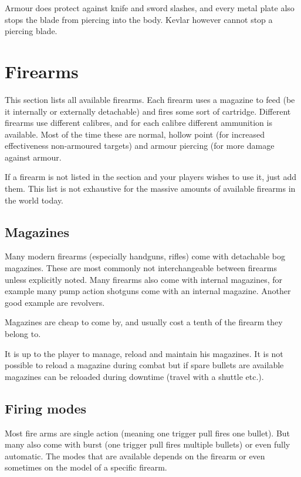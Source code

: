 Armour does protect against knife and sword slashes, and every metal plate
also stops the blade from piercing into the body. Kevlar however cannot stop
a piercing blade.

\section{Firearms}
\label{sec:9-Firearms}

This section lists all available firearms. Each firearm uses a magazine to feed
(be it internally or externally detachable) and fires some sort of cartridge.
Different firearms use different calibres, and for each calibre different
ammunition is available. Most of the time these are normal, hollow point (for
increased effectiveness non-armoured targets) and armour piercing (for more
damage against armour.

If a firearm is not listed in the section and your players wishes to use it,
just add them. This list is not exhaustive for the massive amounts of available
firearms in the world today.

\subsection{Magazines}
\label{sub:9-Magazines}

Many modern firearms (especially handguns, rifles) come with detachable bog
magazines. These are most commonly not interchangeable between firearms unless
explicitly noted. Many firearms also come with internal magazines, for example
many pump action shotguns come with an internal magazine. Another good example
are revolvers.

Magazines are cheap to come by, and usually cost a tenth of the firearm they
belong to.

It is up to the player to manage, reload and maintain his magazines. It is not
possible to reload a magazine during combat but if spare bullets are available
magazines can be reloaded during downtime (travel with a shuttle etc.).

\subsection{Firing modes}
\label{sub:9-Firing modes}

Most fire arms are single action (meaning one trigger pull fires one bullet).
But many also come with burst (one trigger pull fires multiple bullets) or
even fully automatic. The modes that are available depends on the firearm or
even sometimes on the model of a specific firearm.

